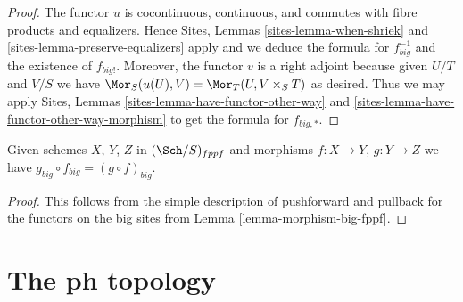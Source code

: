 \begin{proof}
The functor $u$ is cocontinuous, continuous, and commutes with fibre products
and equalizers. Hence
Sites, Lemmas \ref{sites-lemma-when-shriek} and
\ref{sites-lemma-preserve-equalizers}
apply and we deduce the formula
for $f_{big}^{-1}$ and the existence of $f_{big!}$. Moreover,
the functor $v$ is a right adjoint because given $U/T$ and $V/S$
we have $\Mor_S(u(U), V) = \Mor_T(U, V \times_S T)$
as desired. Thus we may apply
Sites, Lemmas \ref{sites-lemma-have-functor-other-way} and
\ref{sites-lemma-have-functor-other-way-morphism} to get the
formula for $f_{big, *}$.
\end{proof}

\begin{lemma}
\label{lemma-composition-fppf}
Given schemes $X$, $Y$, $Z$ in $(\Sch/S)_{fppf}$
and morphisms $f : X \to Y$, $g : Y \to Z$ we have
$g_{big} \circ f_{big} = (g \circ f)_{big}$.
\end{lemma}

\begin{proof}
This follows from the simple description of pushforward
and pullback for the functors on the big sites from
Lemma \ref{lemma-morphism-big-fppf}.
\end{proof}



















































\section{The ph topology}
\label{section-ph}

